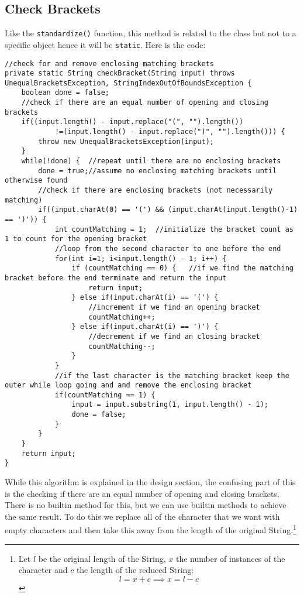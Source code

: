 \documentclass[../../../../main.tex]{subfiles}
\begin{document}
\subsection{Check Brackets}
Like the \texttt{standardize()} function, this method is related to the class but not to a specific object hence it will be \texttt{static}. Here is the code:
\begin{verbatim}
//check for and remove enclosing matching brackets
private static String checkBracket(String input) throws UnequalBracketsException, StringIndexOutOfBoundsException {
	boolean done = false;
	//check if there are an equal number of opening and closing brackets
	if((input.length() - input.replace("(", "").length())
			!=(input.length() - input.replace(")", "").length())) {
		throw new UnequalBracketsException(input);
	}
	while(!done) {	//repeat until there are no enclosing brackets
		done = true;//assume no enclosing matching brackets until otherwise found
		//check if there are enclosing brackets (not necessarily matching)
		if((input.charAt(0) == '(') && (input.charAt(input.length()-1) == ')')) {
			int countMatching = 1;	//initialize the bracket count as 1 to count for the opening bracket 
			//loop from the second character to one before the end
			for(int i=1; i<input.length() - 1; i++) {
				if (countMatching == 0) {	//if we find the matching bracket before the end terminate and return the input
					return input;
				} else if(input.charAt(i) == '(') {
					//increment if we find an opening bracket
					countMatching++;
				} else if(input.charAt(i) == ')') {
					//decrement if we find an closing bracket
					countMatching--;
				}			
			}
			//if the last character is the matching bracket keep the outer while loop going and and remove the enclosing bracket
			if(countMatching == 1) {	
				input = input.substring(1, input.length() - 1);
				done = false;
			}
		}
	}
	return input;
}
\end{verbatim}
While this algorithm is explained in the design section, the confusing part of this is the checking if there are an equal number of opening and closing brackets. There is no builtin method for this, but we can use builtin methods to achieve the same result. To do this\cite{countInstanceStringJava} we replace all of the character that we want with empty characters and then take this away from the length of the original String.\footnote{Let $l$ be the original length of the String, $x$ the number of instances of the character and $c$ the length of the reduced String:\[l = x + c \implies x = l - c\]}
\end{document}
